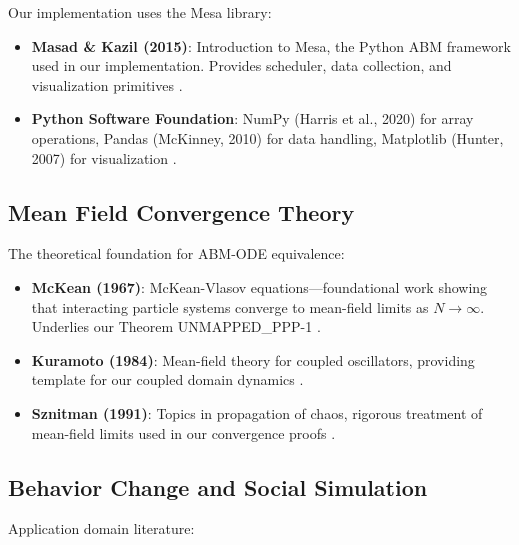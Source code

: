 Our implementation uses the Mesa library:

\begin{itemize}
\item \textbf{Masad \& Kazil (2015)}: Introduction to Mesa, the Python ABM framework
      used in our implementation. Provides scheduler, data collection, and
      visualization primitives \citep{masad2015mesa}.

\item \textbf{Python Software Foundation}: NumPy (Harris et al., 2020) for array
      operations, Pandas (McKinney, 2010) for data handling, Matplotlib (Hunter, 2007)
      for visualization \citep{harris2020numpy, mckinney2010pandas, hunter2007matplotlib}.
\end{itemize}

\subsection{Mean Field Convergence Theory}

The theoretical foundation for ABM-ODE equivalence:

\begin{itemize}
\item \textbf{McKean (1967)}: McKean-Vlasov equations---foundational work showing
      that interacting particle systems converge to mean-field limits as $N \to \infty$.
      Underlies our Theorem UNMAPPED_PPP-1 \citep{mckean1967propagation}.

\item \textbf{Kuramoto (1984)}: Mean-field theory for coupled oscillators, providing
      template for our coupled domain dynamics \citep{kuramoto1984chemical}.

\item \textbf{Sznitman (1991)}: Topics in propagation of chaos, rigorous treatment
      of mean-field limits used in our convergence proofs \citep{sznitman1991propagation}.
\end{itemize}

\subsection{Behavior Change and Social Simulation}

Application domain literature:


